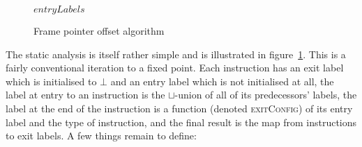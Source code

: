 \begin{figure}
\begin{algorithmic}
  \EndFor
     \EndFor
  \EndWhile
  \State \Return $entryLabels$
\end{algorithmic}
\caption{Frame pointer offset algorithm}
\label{fig:derive:frame_pointer_alg}
\end{figure}

The static analysis is itself rather simple and is illustrated in
figure~\ref{fig:derive:frame_pointer_alg}.  This is a fairly
conventional iteration to a fixed point.  Each instruction has an exit
label which is initialised to $\bot$ and an entry label which is not
initialised at all, the label at entry to an instruction is the
$\sqcup$-union of all of its predecessors' labels, the label at the
end of the instruction is a function (denoted \textsc{exitConfig}) of
its entry label and the type of instruction, and the final result is
the map from instructions to exit labels.  A few things remain to
define:

